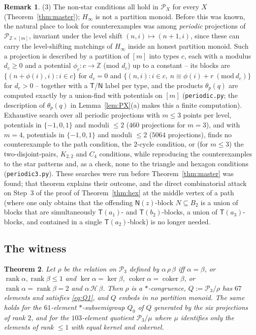 \documentclass[11pt]{amsart}
\newtheorem{theorem}{Theorem}[section]
\theoremstyle{definition}
\newtheorem{remark}[theorem]{Remark}
\newcommand{\Hh}{\mathcal{H}}
\renewcommand{\P}{\mathcal{P}}
\newcommand{\T}{\mathsf{T}}
\newcommand{\N}{\mathsf{N}}
\newcommand{\rk}{\operatorname{rank}}
\newcommand{\Z}{\mathbb{Z}}
\begin{document}
\begin{remark}
(3) The non-star conditions all hold in $\P_X$ for every $X$ (Theorem~\ref{thm:master}); $H_\infty$ is not a partition monoid. Before this was known, the natural place to look for counterexamples was among \emph{periodic} projections of $\P_{\Z\times[m]}$, invariant under the level shift $(n,i)\mapsto(n+1,i)$, since these can carry the level-shifting matchings of $H_\infty$ inside an honest partition monoid. Such a projection is described by a partition of $[m]$ into types $c$, each with a modulus $d_c\ge0$ and a potential $\phi_c:c\to\Z$ (mod $d_c$) up to a constant -- its blocks are $\{(n+\phi(i),i):i\in c\}$ for $d_c=0$ and $\{(n,i):i\in c,\ n\equiv\phi(i)+r\ (\mathrm{mod}\ d_c)\}$ for $d_c>0$ -- together with a $\T$/$\N$ label per type, and the products $\theta_p(q)$ are computed exactly by a union-find with potentials on $[m]$ (\texttt{periodic.py}; the description of $\theta_p(q)$ in Lemma~\ref{lem:PX}(a) makes this a finite computation). Exhaustive search over all periodic projections with $m\le3$ points per level, potentials in $\{-1,0,1\}$ and moduli $\le2$ ($460$ projections for $m=3$), and with $m=4$, potentials in $\{-1,0,1\}$ and moduli $\le2$ ($5064$ projections), finds no counterexample to the path condition, the $2$-cycle condition, or (for $m\le3$) the two-disjoint-pairs, $K_{2,2}$ and $C_4$ conditions, while reproducing the counterexamples to the star patterns and, as a check, none to the triangle and hexagon conditions (\texttt{periodic3.py}). These searches were run before Theorem~\ref{thm:master} was found; that theorem explains their outcome, and the direct combinatorial attack on Step~3 of the proof of Theorem~\ref{thm:hex} at the middle vertex of a path (where one only obtains that the offending $\N(z)$-block $N\subseteq B_2$ is a union of blocks that are simultaneously $\T(a_1)$- and $\T(b_2)$-blocks, a union of $\T(a_3)$-blocks, and contained in a single $\T(a_2)$-block) is no longer needed.
\end{remark}

\subsection{The witness}\label{subsec:witness}

\begin{theorem}\label{thm:witness}
Let $\rho$ be the relation on $\P_3$ defined by $\alpha\,\rho\,\beta$ iff $\alpha=\beta$, or $\rk\alpha,\rk\beta\le1$ and $\ker\alpha=\ker\beta$, $\operatorname{coker}\alpha=\operatorname{coker}\beta$, or $\rk\alpha=\rk\beta=2$ and $\alpha\,\Hh\,\beta$. Then $\rho$ is a $*$-congruence, $Q:=\P_3/\rho$ has $67$ elements and satisfies \eqref{eq:Q1}, and $Q$ embeds in no partition monoid. The same holds for the $61$-element $*$-subsemigroup $Q_0$ of $Q$ generated by the six projections of rank $2$, and for the $103$-element quotient $\P_3/\mu$ where $\mu$ identifies only the elements of rank $\le1$ with equal kernel and cokernel.
\end{theorem}
\end{document}
